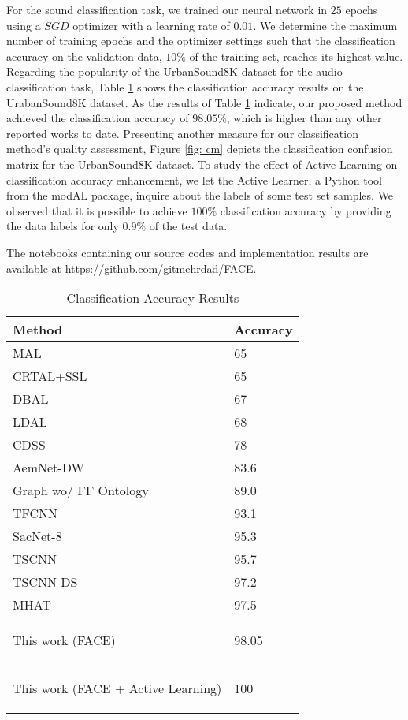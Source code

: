 \documentclass{article}
\begin{document}
For the sound classification task, we trained our neural network in $25$ epochs using a $SGD$ optimizer with a learning rate of $0.01$. We determine the maximum number of training epochs and the optimizer settings such that the classification accuracy on the validation data, $10\%$ of the training set, reaches its highest value. Regarding the popularity of the UrbanSound8K dataset for the audio classification task, Table \ref{tab: class} shows the classification accuracy results on the UrabanSound8K dataset. As the results of Table \ref{tab: class} indicate, our proposed method achieved the classification accuracy of $98.05\%$, which is higher than any other reported works to date. Presenting another measure for our classification method's quality assessment, Figure \ref{fig: cm} depicts the classification confusion matrix for the UrbanSound8K dataset. To study the effect of Active Learning on classification accuracy enhancement, we let the Active Learner, a Python tool from the modAL package, inquire about the labels of some test set samples. We observed that it is possible to achieve $100\%$ classification accuracy by providing the data labels for only $0.9\%$ of the test data.

The notebooks containing our source codes and implementation results are available at \href{https://github.com/gitmehrdad/FACE}{https://github.com/gitmehrdad/FACE.}

\begin{table}
	\caption{Classification Accuracy Results}
	\centering
	\label{tab: class}
	\begin{tabular}{ll}
		\toprule
		Method      & Accuracy	\\
		\midrule
		MAL\citep{Shuyang}				& 65	\\
		CRTAL+SSL\citep{Dilek, Malte}	& 65	\\	
		DBAL\citep{Ji}					& 67	\\
		LDAL\citep{Qin}					& 68	\\
		CDSS\citep{Lee}					& 78	\\
		AemNet-DW\citep{Lopez}			& 83.6	\\
		Graph wo/ FF Ontology\citep{Sun}& 89.0	\\
		TFCNN\citep{Mu}					& 93.1	\\
		SacNet-8\citep{Li}				& 95.3	\\
		TSCNN\citep{Dong}				& 95.7	\\
		TSCNN-DS\citep{Su}				& 97.2	\\
		MHAT\citep{Song}				& 97.5	\\
		\begin{bfseries}This work (FACE) \end{bfseries} 	& \begin{bfseries}98.05 \end{bfseries} 		\\
		\begin{bfseries}This work (FACE + Active Learning) \end{bfseries} 	& \begin{bfseries}100 \end{bfseries} 		\\
		\bottomrule
	\end{tabular}
\end{table}
\end{document}
